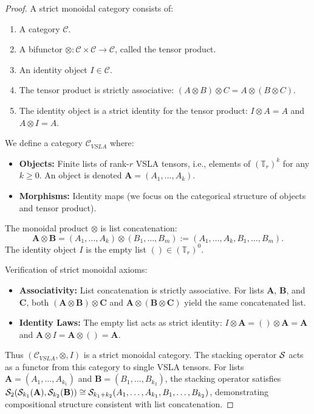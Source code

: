 \begin{proof}
A strict monoidal category consists of:
\begin{enumerate}
    \item A category $\mathcal{C}$.
    \item A bifunctor $\otimes: \mathcal{C} \times \mathcal{C} \to \mathcal{C}$, called the tensor product.
    \item An identity object $I \in \mathcal{C}$.
    \item The tensor product is strictly associative: $(A \otimes B) \otimes C = A \otimes (B \otimes C)$.
    \item The identity object is a strict identity for the tensor product: $I \otimes A = A$ and $A \otimes I = A$.
\end{enumerate}

We define a category $\mathcal{C}_{VSLA}$ where:
\begin{itemize}
    \item \textbf{Objects:} Finite lists of rank-$r$ VSLA tensors, i.e., elements of $(\mathbb{T}_r)^k$ for any $k \ge 0$. An object is denoted $\mathbf{A} = (A_1, \dots, A_k)$.
    \item \textbf{Morphisms:} Identity maps (we focus on the categorical structure of objects and tensor product).
\end{itemize}

The monoidal product $\otimes$ is list concatenation:
\[
    \mathbf{A} \otimes \mathbf{B} = (A_1, \dots, A_k) \otimes (B_1, \dots, B_m) := (A_1, \dots, A_k, B_1, \dots, B_m).
\]
The identity object $I$ is the empty list $() \in (\mathbb{T}_r)^0$.

Verification of strict monoidal axioms:
\begin{itemize}
    \item \textbf{Associativity:} List concatenation is strictly associative. For lists $\mathbf{A}$, $\mathbf{B}$, and $\mathbf{C}$, both $(\mathbf{A} \otimes \mathbf{B}) \otimes \mathbf{C}$ and $\mathbf{A} \otimes (\mathbf{B} \otimes \mathbf{C})$ yield the same concatenated list.
    \item \textbf{Identity Laws:} The empty list acts as strict identity: $I \otimes \mathbf{A} = () \otimes \mathbf{A} = \mathbf{A}$ and $\mathbf{A} \otimes I = \mathbf{A} \otimes () = \mathbf{A}$.
\end{itemize}

Thus $(\mathcal{C}_{VSLA}, \otimes, I)$ is a strict monoidal category. The stacking operator $\mathcal{S}$ acts as a functor from this category to single VSLA tensors. For lists $\mathbf{A} = (A_1, \ldots, A_{k_1})$ and $\mathbf{B} = (B_1, \ldots, B_{k_2})$, the stacking operator satisfies $\mathcal{S}_2(\mathcal{S}_{k_1}(\mathbf{A}), \mathcal{S}_{k_2}(\mathbf{B})) \cong \mathcal{S}_{k_1+k_2}(A_1, \ldots, A_{k_1}, B_1, \ldots, B_{k_2})$, demonstrating compositional structure consistent with list concatenation.
\end{proof}


